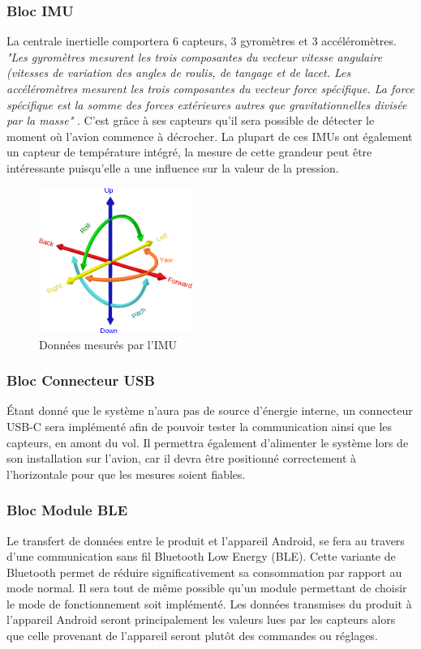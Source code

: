     \subsubsection{Bloc IMU}
        La centrale inertielle comportera 6 capteurs, 3 gyromètres et 3 accéléromètres. \emph{"Les gyromètres mesurent les trois composantes du vecteur vitesse angulaire (vitesses de variation des angles de roulis, de tangage et de lacet. Les accéléromètres mesurent les trois composantes du vecteur force spécifique. La force spécifique est la somme des forces extérieures autres que gravitationnelles divisée par la masse"} \cite{noauthor_centrale_2022}.
        C’est grâce à ses capteurs qu’il sera possible de détecter le moment où l'avion commence à décrocher. La plupart de ces IMUs ont également un capteur de température intégré, la mesure de cette grandeur peut être intéressante puisqu'elle a une influence sur la valeur de la pression.
        \begin{figure}[ht]
            \caption{Données mesurés par l'IMU}
            \centering
            \includegraphics[width=5cm]{Images/6axes.png}
        \end{figure}
        \vspace{1cm}
    
    \subsubsection{Bloc Connecteur USB}
        Étant donné que le système n'aura pas de source d'énergie interne, un connecteur USB-C sera implémenté afin de pouvoir tester la communication ainsi que les capteurs, en amont du vol. Il permettra également d'alimenter le système lors de son installation sur l'avion, car il devra être positionné correctement à l'horizontale pour que les mesures soient fiables.\newpage
        
    \subsubsection{Bloc Module BLE}
        Le transfert de données entre le produit et l'appareil Android, se fera au travers d'une communication sans fil Bluetooth Low Energy (BLE). Cette variante de Bluetooth permet de réduire significativement sa consommation par rapport au mode normal. Il sera tout de même possible qu'un module permettant de choisir le mode de fonctionnement soit implémenté. Les données transmises du produit à l'appareil Android seront principalement les valeurs lues par les capteurs alors que celle provenant de l'appareil seront plutôt des commandes ou réglages.\vspace{1cm}
    
